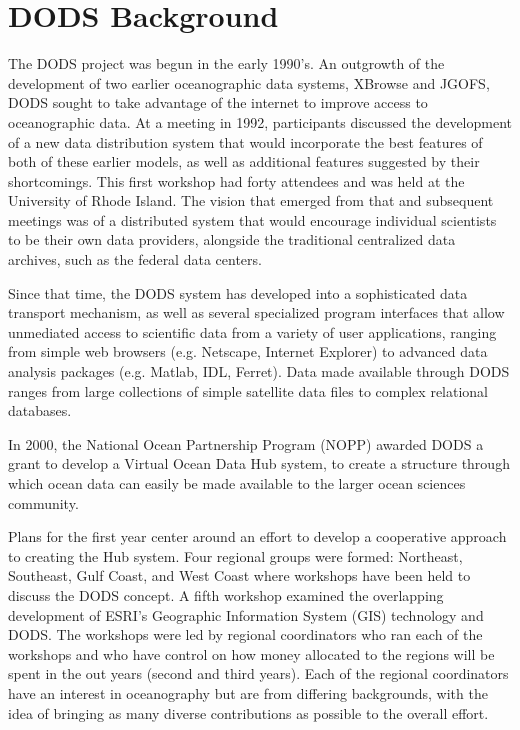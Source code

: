 \documentclass{report}
\begin{document}
\chapter{DODS Background}

The DODS project was begun in the early 1990's.  An outgrowth of the
development of two earlier oceanographic data systems, XBrowse and
JGOFS, DODS sought to take advantage of the internet to improve access
to oceanographic data.  At a meeting in 1992, participants discussed
the development of a new data distribution system that would
incorporate the best features of both of these earlier models, as well
as additional features suggested by their shortcomings.  This first
workshop had forty attendees and was held at the University of Rhode
Island.  The vision that emerged from that and subsequent meetings was
of a distributed system that would encourage individual scientists to
be their own data providers, alongside the traditional centralized
data archives, such as the federal data centers.

Since that time, the DODS system has developed into a sophisticated
data transport mechanism, as well as several specialized program
interfaces that allow unmediated access to scientific data from a
variety of user applications, ranging from simple web browsers (e.g.
Netscape, Internet Explorer) to advanced data analysis packages (e.g.
Matlab, IDL, Ferret).  Data made available through DODS ranges from
large collections of simple satellite data files to complex relational
databases.

In 2000, the National Ocean Partnership Program (NOPP) awarded DODS a
grant to develop a Virtual Ocean Data Hub system, to create a
structure through which ocean data can easily be made available to the
larger ocean sciences community.

Plans for the first year center around an effort to develop a
cooperative approach to creating the Hub system.  Four regional groups
were formed: Northeast, Southeast, Gulf Coast, and West Coast where
workshops have been held to discuss the DODS concept.  A fifth
workshop examined the overlapping development of ESRI's Geographic
Information System (GIS) technology and DODS.  The workshops were led
by regional coordinators who ran each of the workshops and who have
control on how money allocated to the regions will be spent in the out
years (second and third years).  Each of the regional coordinators
have an interest in oceanography but are from differing backgrounds,
with the idea of bringing as many diverse contributions as possible to
the overall effort.
\end{document}
